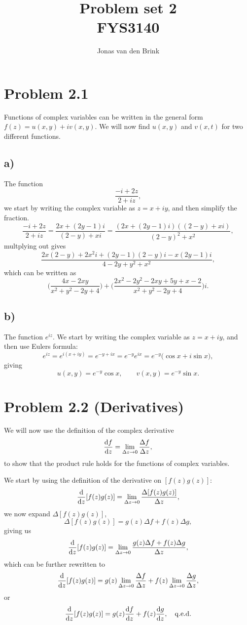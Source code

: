 \documentclass[a4paper, 11pt, titlepage, english]{article}
\author{Jonas van den Brink}
\title{Problem set 2 \\ FYS3140}
\renewcommand{\d}{{\rm d}}
\begin{document}
\maketitle


\section*{Problem 2.1}
Functions of complex variables can be written in the general form $f(z)=u(x,y) + i v(x,y)$. We will now find $u(x,y)$ and $v(x,t)$ for two different functions.
\subsection*{a)}
The function 
$$\frac{-i+2z}{2+iz},$$
we start by writing the complex variable as $z=x+iy$, and then simplify the fraction.
$$\frac{-i+2z}{2+iz} = \frac{2x + (2y-1)i}{(2-y) + xi} = \frac{(2x + (2y-1)i)((2-y) + xi)}{(2-y)^2 + x^2},$$
multplying out gives
$$\frac{2x(2-y) + 2x^2i + (2y-1)(2-y)i - x(2y-1)i}{4 - 2y + y^2 + x^2},$$
which can be written as
$$\bigg( \frac{4x - 2xy}{x^2 + y^2 -2y + 4}\bigg) + \bigg(\frac{2x^2 -2y^2-2xy+5y+x-2}{x^2 +y^2-2y+4}\bigg)i.$$

\subsection*{b)}
The function $e^{iz}$. We start by writing the complex variable as $z = x + iy$, and then use Eulers formula:
$$ e^{iz} = e^{i(x+iy)} = e^{-y + ix} = e^{-y}e^{ix} = e^{-y}\bigg(\cos x + i \sin x\bigg), $$
giving
$$u(x,y) = e^{-y}\cos x, \qquad v(x,y) = e^{-y}\sin x.$$

\clearpage 

\section*{Problem 2.2 (Derivatives)}
We will now use the definition of the complex derivative
$$\frac{\d f}{\d z} = \lim_{\Delta z \to 0} \frac{\Delta f}{\Delta z},$$
to show that the product rule holds for the functions of complex variables.

We start by using the definition of the derivative on $[f(z)g(z)]$:
$$\frac{\d}{\d z}[f(z)g(z)] = \lim_{\Delta z \to 0} \frac{\Delta [ f(z)g(z) ]}{\Delta z},$$
we now expand $\Delta [ f(z)g(z) ]$,
$$\Delta [ f(z)g(z) ] = g(z) \Delta f + f(z)\Delta g,$$
giving us
$$\frac{\d}{\d z}[f(z)g(z)] = \lim_{\Delta z \to 0} \frac{g(z)\Delta f + f(z) \Delta g}{\Delta z},$$
which can be further rewritten to
$$\frac{\d}{\d z}[f(z)g(z)] = g(z) \lim_{\Delta z \to 0} \frac{\Delta f}{\Delta z} + f(z) \lim_{\Delta z \to 0} \frac{\Delta g}{\Delta z},$$
or
$$\frac{\d}{\d z}[f(z)g(z)] = g(z)\frac{\d f}{\d z} + f(z)\frac{\d g}{\d z}, \quad {\rm q.e.d.}$$
\end{document}
